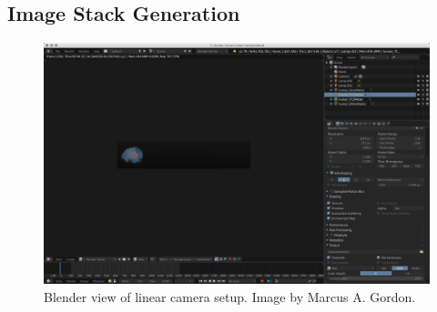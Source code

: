 \subsection{Image Stack Generation}
\begin{figure}[H]
  \centering
  \includegraphics[width=\linewidth]{img/linCam1.png}
  \caption{Blender view of linear camera setup. Image by Marcus A. Gordon.}
\end{figure}